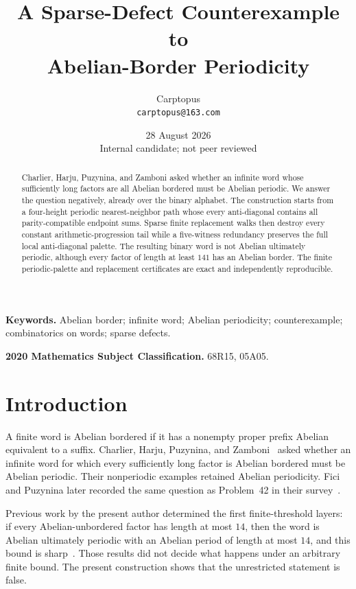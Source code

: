 \documentclass[11pt]{article}
\title{A Sparse-Defect Counterexample to\\
Abelian-Border Periodicity}
\author{Carptopus\\\small\texttt{carptopus@163.com}}
\date{28 August 2026\\\small Internal candidate; not peer reviewed}
\begin{document}
\maketitle

\begin{abstract}
Charlier, Harju, Puzynina, and Zamboni asked whether an infinite word whose
sufficiently long factors are all Abelian bordered must be Abelian periodic.
We answer the question negatively, already over the binary alphabet. The
construction starts from a four-height periodic nearest-neighbor path whose
every anti-diagonal contains all parity-compatible endpoint sums. Sparse
finite replacement walks then destroy every constant arithmetic-progression
tail while a five-witness redundancy preserves the full local anti-diagonal
palette. The resulting binary word is not Abelian ultimately periodic,
although every factor of length at least $141$ has an Abelian border. The
finite periodic-palette and replacement certificates are exact and
independently reproducible.
\end{abstract}

\noindent\textbf{Keywords.} Abelian border; infinite word; Abelian
periodicity; counterexample; combinatorics on words; sparse defects.

\medskip
\noindent\textbf{2020 Mathematics Subject Classification.} 68R15, 05A05.

\section{Introduction}

A finite word is Abelian bordered if it has a nonempty proper prefix Abelian
equivalent to a suffix. Charlier, Harju, Puzynina, and
Zamboni~\cite[Question~1]{CHPZ} asked whether an infinite word for which every
sufficiently long factor is Abelian bordered must be Abelian periodic. Their
nonperiodic examples retained Abelian periodicity. Fici and Puzynina later
recorded the same question as Problem~42 in their survey~\cite{FP}.

Previous work by the present author determined the first finite-threshold
layers: if every Abelian-unbordered factor has length at most $14$, then the
word is Abelian ultimately periodic with an Abelian period of length at most
$14$, and this bound is sharp~\cite{CarptopusThresholds}. Those results did
not decide what happens under an arbitrary finite bound. The present
construction shows that the unrestricted statement is false.
\end{document}
